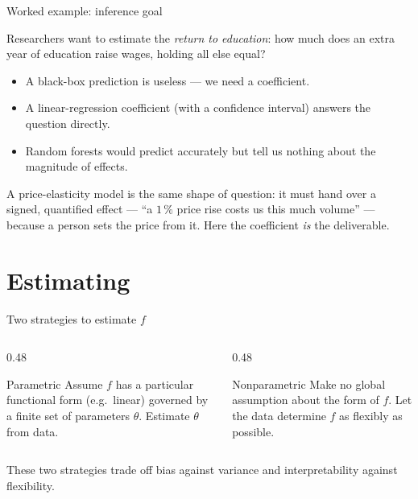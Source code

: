 \documentclass[aspectratio=169,11pt]{beamer}
\begin{document}
\begin{frame}{Worked example: inference goal}
  \begin{numexample}
    Researchers want to estimate the \emph{return to education}: how
    much does an extra year of education raise wages, holding all
    else equal?
    \begin{itemize}
      \item A black-box prediction is useless --- we need a coefficient.
      \item A linear-regression coefficient (with a confidence
            interval) answers the question directly.
      \item Random forests would predict accurately but tell us
            nothing about the magnitude of effects.
    \end{itemize}
  \end{numexample}
  A price-elasticity model is the same shape of question: it must hand over a signed,
  quantified effect --- ``a $1\,\%$ price rise costs us this much volume'' --- because a
  person sets the price from it. Here the coefficient \emph{is} the deliverable.
\end{frame}


\section{Estimating}

\begin{frame}{Two strategies to estimate $f$}
  \begin{columns}[T]
    \begin{column}{0.48\textwidth}
      \begin{block}{Parametric}
        Assume $f$ has a particular functional form (e.g.\ linear)
        governed by a finite set of parameters $\theta$. Estimate
        $\theta$ from data.
      \end{block}
    \end{column}
    \begin{column}{0.48\textwidth}
      \begin{block}{Nonparametric}
        Make no global assumption about the form of $f$. Let the
        data determine $f$ as flexibly as possible.
      \end{block}
    \end{column}
  \end{columns}
  \begin{takeaway}
    These two strategies trade off bias against variance and
    interpretability against flexibility.
  \end{takeaway}
\end{frame}
\end{document}
